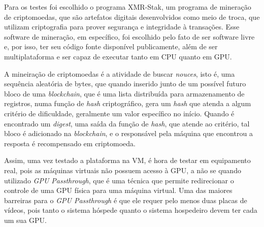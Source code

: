 Para os testes foi escolhido o programa XMR-Stak\cite{xmr_stak}, um programa de mineração de criptomoedas, que são artefatos digitais desenvolvidos como meio de troca, que utilizam criptografia para prover segurança e integridade à transações\cite{crypto_currencies}. Esse software de mineração, em específico, foi escolhido pelo fato de ser software livre e, por isso, ter seu código fonte disponível publicamente, além de ser multiplataforma e ser capaz de executar tanto em CPU quanto em GPU.

A mineiração de criptomoedas é a atividade de buscar \textit{nouces}, isto é, uma sequência aleatória de bytes, que quando inserido junto de um possível futuro bloco de uma \textit{blockchain}, que é uma lista distribuída para armazenamento de registros, numa função de \textit{hash} criptográfico, gera um \textit{hash} que atenda a algum critério de dificuldade, geralmente um valor específico no início. Quando é encontrado um \textit{digest}, uma saída da função de \textit{hash}, que atende ao critério, tal bloco é adicionado na \textit{blockchain}, e o responsável pela máquina que encontrou a resposta é recompensado em criptomoeda.

Assim, uma vez testado a plataforma na \acrshort{VM}, é hora de testar em equipamento real, pois as máquinas virtuais não possuem acesso à \acrshort{GPU}, a não se quando utilizado \textit{\acrshort{GPU} Passthrough}, que é uma técnica que permite redirecionar o controle de uma \acrshort{GPU} física para uma máquina virtual. Uma das maiores barreiras para o \textit{\acrshort{GPU} Passthrough} é que ele requer pelo menos duas placas de vídeos, pois tanto o sistema hóspede quanto o sistema hospedeiro devem ter cada um sua \acrshort{GPU}.


